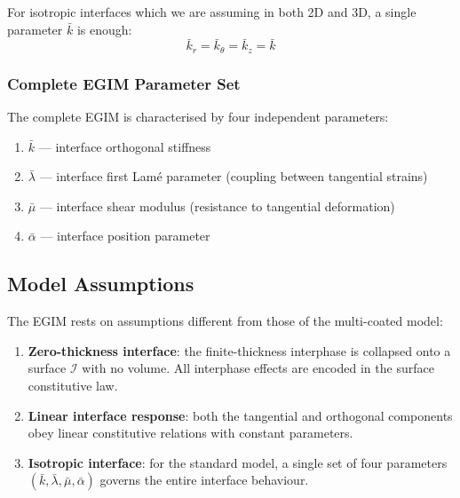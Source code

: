 \documentclass[oneside, 12pt, a4paper, bibliography=totoc]{book}
\begin{document}
For isotropic interfaces which we are assuming in both 2D and 3D, a single parameter $\bar{k}$ is enough:
%
\begin{equation}
    \bar{k}_r = \bar{k}_\theta = \bar{k}_z = \bar{k}
    \label{eq:isotropic_interface_stiffness}
\end{equation}

\subsubsection{Complete EGIM Parameter Set}

The complete EGIM is characterised by four independent parameters:
%
\begin{enumerate}
    \item $\bar{k}$ --- interface orthogonal stiffness 
    \item $\bar{\lambda}$ --- interface first Lam\'{e} parameter (coupling between tangential strains)
    \item $\bar{\mu}$ --- interface shear modulus (resistance to tangential deformation)
    \item $\bar{\alpha}$ --- interface position parameter
\end{enumerate}



\subsection{Model Assumptions}
\label{subsec:interface_assumptions}

The EGIM rests on assumptions different from those of the multi-coated model:

\begin{enumerate}
    \item \textbf{Zero-thickness interface}: the finite-thickness interphase is collapsed onto a surface $\mathcal{I}$ with no volume. All interphase effects are encoded in the surface constitutive law.
    \item \textbf{Linear interface response}: both the tangential and orthogonal components obey linear constitutive relations with constant parameters.
    \item \textbf{Isotropic interface}: for the standard model, a single set of four parameters $(\bar{k}, \bar{\lambda}, \bar{\mu}, \bar{\alpha})$ governs the entire interface behaviour.
\end{enumerate}
\end{document}

